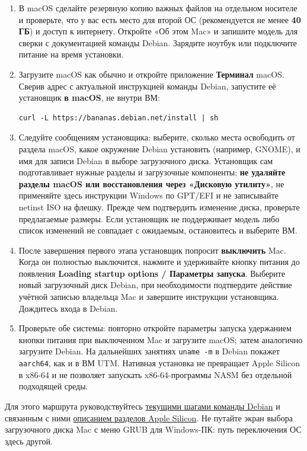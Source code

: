 \begin{enumerate}
\def\labelenumi{\arabic{enumi}.}
\item
  В macOS сделайте резервную копию важных файлов на отдельном носителе и
  проверьте, что у вас есть место для второй ОС (рекомендуется не менее
  \textbf{40 ГБ}) и доступ к интернету. Откройте «Об этом Mac» и
  запишите модель для сверки с документацией команды Debian. Зарядите
  ноутбук или подключите питание на время установки.
\item
  Загрузите macOS как обычно и откройте приложение \textbf{Терминал}
  macOS. Сверив адрес с актуальной инструкцией команды Debian, запустите
  её установщик \textbf{в macOS}, не внутри ВМ:

\begin{verbatim}
curl -L https://bananas.debian.net/install | sh
\end{verbatim}
\item
  Следуйте сообщениям установщика: выберите, сколько места освободить от
  раздела macOS, какое окружение Debian установить (например, GNOME), и
  имя для записи Debian в выборе загрузочного диска. Установщик сам
  подготавливает нужные разделы и загрузочные компоненты; \textbf{не
  удаляйте разделы macOS или восстановления через «Дисковую утилиту»},
  не применяйте здесь инструкции Windows по GPT/EFI и не записывайте
  netinst ISO на флешку. Прежде чем подтвердить изменение диска,
  проверьте предлагаемые размеры. Если установщик не поддерживает модель
  либо список изменений не совпадает с ожидаемым, остановитесь и
  выберите ВМ.
\item
  После завершения первого этапа установщик попросит \textbf{выключить}
  Mac. Когда он полностью выключится, нажмите и удерживайте кнопку
  питания до появления \textbf{Loading startup options / Параметры
  запуска}. Выберите новый загрузочный диск Debian, при необходимости
  подтвердите действие учётной записью владельца Mac и завершите
  инструкции установщика. Дождитесь входа в Debian.
\item
  Проверьте обе системы: повторно откройте параметры запуска удержанием
  кнопки питания при выключенном Mac и загрузите macOS; затем аналогично
  загрузите Debian. На дальнейших занятиях \texttt{uname\ -m} в Debian
  покажет \texttt{aarch64}, как и в ВМ UTM. Нативная установка не
  превращает Apple Silicon в x86-64 и не позволяет запускать
  x86-64-программы NASM без отдельной подходящей среды.
\end{enumerate}

Для этого маршрута руководствуйтесь
\href{https://wiki.debian.org/Teams/Bananas}{текущими шагами команды
Debian} и связанным с ними
\href{https://asahilinux.org/docs/sw/partitioning-cheatsheet/}{описанием
разделов Apple Silicon}. Не путайте экран выбора загрузочного диска Mac
с меню GRUB для Windows-ПК: путь переключения ОС здесь другой.


